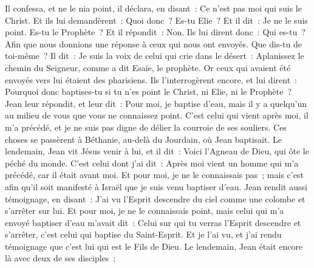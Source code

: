 \begin{multicols}{2}
Il confessa, et ne le nia point, il déclara, en disant~: Ce n'est pas moi qui suis le Christ.
Et ils lui demandèrent~: Quoi donc~? Es-tu Elie~? Et il dit~: Je ne le suis point. Es-tu le Prophète~? Et il répondit~: Non.
Ils lui dirent donc~: Qui es-tu~? Afin que nous donnions une réponse à ceux qui nous ont envoyés. Que dis-tu de toi-même~?
Il dit~: Je suis la voix de celui qui crie dans le désert~: Aplanissez le chemin du Seigneur, comme a dit Esaïe, le prophète.
Or ceux qui avaient été envoyés vers lui étaient des pharisiens.
Ils l'interrogèrent encore, et lui dirent~: Pourquoi donc baptises-tu si tu n'es point le Christ, ni Elie, ni le Prophète~?
Jean leur répondit, et leur dit~: Pour moi, je baptise d'eau, mais il y a quelqu'un au milieu de vous que vous ne connaissez point.
C'est celui qui vient après moi, il m'a précédé, et je ne suis pas digne de délier la courroie de ses souliers.
Ces choses se passèrent à Béthanie, au-delà du Jourdain, où Jean baptisait.
Le lendemain, Jean vit Jésus venir à lui, et il dit~: Voici l'Agneau de Dieu, qui ôte le péché du monde.
C'est celui dont j'ai dit~: Après moi vient un homme qui m'a précédé, car il était avant moi.
Et pour moi, je ne le connaissais pas~; mais c'est afin qu'il soit manifesté à Israël que je suis venu baptiser d'eau.
Jean rendit aussi témoignage, en disant~: J'ai vu l'Esprit descendre du ciel comme une colombe et s'arrêter sur lui.
Et pour moi, je ne le connaissais point, mais celui qui m'a envoyé baptiser d'eau m'avait dit~: Celui sur qui tu verras l'Esprit descendre et s'arrêter, c'est celui qui baptise du Saint-Esprit.
Et je l'ai vu, et j'ai rendu témoignage que c'est lui qui est le Fils de Dieu.
Le lendemain, Jean était encore là avec deux de ses disciples~;

\end{multicols}
